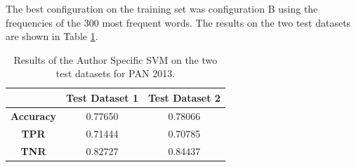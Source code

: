 The best configuration on the training set was configuration B using the
frequencies of the 300 most frequent words. The results on the two test datasets
are shown in Table \ref{table:svm_results}.

\begin{table}
    \centering
    \begin{tabular}{c|cc}
        & \textbf{Test Dataset 1} & \textbf{Test Dataset 2} \\
        \hline
        \textbf{Accuracy}  & 0.77650 & 0.78066 \\
        \textbf{\gls{TPR}} & 0.71444 & 0.70785 \\
        \textbf{\gls{TNR}} & 0.82727 & 0.84437
    \end{tabular}
    \caption{Results of the Author Specific SVM on the two test datasets for PAN
    2013.}
    \label{table:svm_results}
\end{table}
